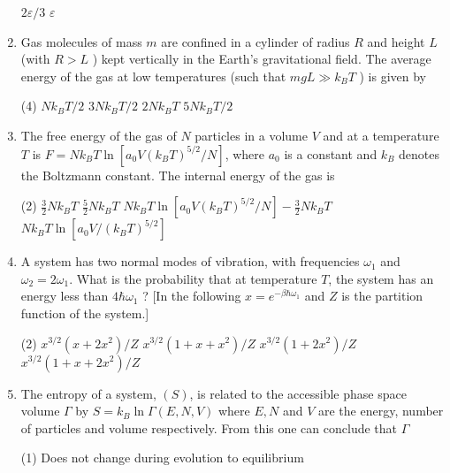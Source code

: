 \begin{enumerate}
\begin{tasks}
	\task[\textbf{c.}]$2 \varepsilon / 3$
	\task[\textbf{d.}]  $\varepsilon$
\end{tasks}	
\item 	Gas molecules of mass $m$ are confined in a cylinder of radius $R$ and height $L$ (with $R>L$ ) kept vertically in the Earth's gravitational field. The average energy of the gas at low temperatures (such that $m g L \gg k_{B} T$ ) is given by
{	}
	 \begin{tasks}(4)
		\task[\textbf{a.}]$N k_{B} T / 2$
		\task[\textbf{b.}]$3 N k_{B} T / 2$
		\task[\textbf{c.}]$2 N k_{B} T$
		\task[\textbf{d.}] $5 N k_{B} T / 2$
	\end{tasks}
\item 	The free energy of the gas of $N$ particles in a volume $V$ and at a temperature $T$ is $F=N k_{B} T \ln \left[a_{0} V\left(k_{B} T\right)^{5 / 2} / N\right]$, where $a_{0}$ is a constant and $k_{B}$ denotes the Boltzmann constant. The internal energy of the gas is
{	}
 \begin{tasks}(2)
	\task[\textbf{a.}]$\frac{3}{2} N k_{B} T$
	\task[\textbf{b.}]$\frac{5}{2} N k_{B} T$
	\task[\textbf{c.}]$N k_{B} T \ln \left[a_{0} V\left(k_{B} T\right)^{5 / 2} / N\right]-\frac{3}{2} N k_{B} T$
	\task[\textbf{d.}]  $N k_{B} T \ln \left[a_{0} V /\left(k_{B} T\right)^{5 / 2}\right]$
\end{tasks}	
	\item A system has two normal modes of vibration, with frequencies $\omega_{1}$ and $\omega_{2}=2 \omega_{1}$. What is the probability that at temperature $T$, the system has an energy less than $4 \hbar \omega_{1}$ ?
	[In the following $x=e^{-\beta \hbar \omega_{1}}$ and $Z$ is the partition function of the system.]
	{	}
	 \begin{tasks}(2)
		\task[\textbf{a.}]$x^{3 / 2}\left(x+2 x^{2}\right) / Z$
		\task[\textbf{b.}]$x^{3 / 2}\left(1+x+x^{2}\right) / Z$
		\task[\textbf{c.}]$x^{3 / 2}\left(1+2 x^{2}\right) / Z$
		\task[\textbf{d.}] $x^{3 / 2}\left(1+x+2 x^{2}\right) / Z$
	\end{tasks}
\item 	The entropy of a system, $(S)$, is related to the accessible phase space volume $\Gamma$ by $S=k_{B} \ln \Gamma(E, N, V)$ where $E, N$ and $V$ are the energy, number of particles and volume respectively. From this one can conclude that $\Gamma$
{	}
	 \begin{tasks}(1)
		\task[\textbf{a.}]Does not change during evolution to equilibrium

\end{tasks}
\end{enumerate}
